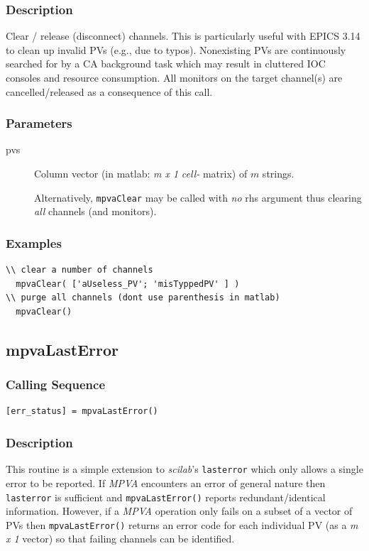 \documentclass{article}
\newcommand{\sca}{\ita{MPVA}}
\newcommand{\scilab}{\ita{scilab}}
\newcommand{\com}[1]{{\tt #1}}
\newcommand{\pbrkf}{\pagebreak}
\newcommand{\ita}[1]{\emph{#1}}
\newcommand{\m}{$m$}
\newcommand{\mhack}{$m$} %
\newcommand{\mxl}{$m\times 1$}
\renewcommand{\m}{\ita{m}}
\newcommand{\mhack}{\ita{m}} %
\renewcommand{\mxl}{\ita{m x 1}}
\renewcommand{\pbrkf}{}
\newcommand{\PVITEM}{
\item[pvs] Column vector (in matlab: \mxl{} \ita{cell-} matrix)
of \mhack{} strings.
}
\begin{document}
\subsubsection{Description}
Clear / release (disconnect) channels. This is particularly useful with
EPICS 3.14 to clean up invalid PVs (e.g., due to typos). Nonexisting PVs are
continuously searched for by a CA background task which may result
in cluttered IOC consoles and resource consumption.
All monitors on the target channel(s) are cancelled/released as a
consequence of this call.
\subsubsection{Parameters}
\begin{description}
\PVITEM
Alternatively, \com{mpvaClear} may be called with {\em no} rhs argument
thus clearing {\em all} channels (and monitors).
\end{description}
\subsubsection{Examples}
\begin{verbatim}
\\ clear a number of channels
  mpvaClear( ['aUseless_PV'; 'misTyppedPV' ] )
\\ purge all channels (dont use parenthesis in matlab)
  mpvaClear()
\end{verbatim}

\vspace*{\fill}
\pbrkf
\subsection{mpvaLastError}
\label{mpvalasterror}
\subsubsection{Calling Sequence}
\begin{verbatim}
[err_status] = mpvaLastError()
\end{verbatim}
\subsubsection{Description}
This routine is a simple extension to \scilab{}'s \com{lasterror}
which only allows a single error to be reported. If \sca{} encounters
an error of general nature then \com{lasterror} is sufficient
and \com{mpvaLastError()} reports redundant/identical information.
However, if a \sca{} operation only fails on a subset of a vector
of PVs then \com{mpvaLastError()} returns an error code for each individual
PV (as a \mxl{} vector) so that failing channels can be identified.
\end{document}
